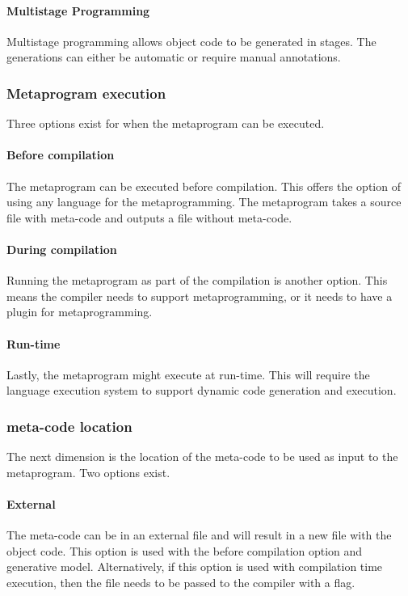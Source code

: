 \paragraph{Multistage Programming}
Multistage programming allows object code to be generated in stages.
The generations can either be automatic or require manual annotations. \cite{sheard_01_01, taha_04_01}

\subsubsection{Metaprogram execution}
Three options exist for when the metaprogram can be executed.

\paragraph{Before compilation}
The metaprogram can be executed before compilation.
This offers the option of using any language for the metaprogramming.
The metaprogram takes a source file with meta-code and outputs a file without meta-code. \cite{savidis_19_01}

\paragraph{During compilation}
Running the metaprogram as part of the compilation is another option.
This means the compiler needs to support metaprogramming, or it needs to have a plugin for metaprogramming. \cite{savidis_19_01}

\paragraph{Run-time}
Lastly, the metaprogram might execute at run-time.
This will require the language execution system to support dynamic code generation and execution. \cite{savidis_19_01}

\subsubsection{meta-code location}
The next dimension is the location of the meta-code to be used as input to the metaprogram.
Two options exist.

\paragraph{External}
The meta-code can be in an external file and will result in a new file with the object code.
This option is used with the before compilation option and generative model.
Alternatively, if this option is used with compilation time execution, then the file needs to be passed to the compiler with a flag. \cite{savidis_19_01}

